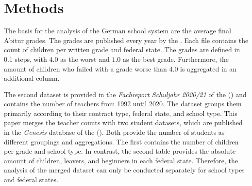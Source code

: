 \section*{Methods}

The basis for the analysis of the German school system are the average final Abitur grades. The grades are published every year by the \citeauthor{kultusminister_konferenz_abiturnoten_nodate}. Each file contains the count of children per written grade and federal state. The grades are defined in $0.1$ steps, with $4.0$ as the worst and $1.0$ as the best grade. Furthermore, the amount of children who failed with a grade worse than $4.0$ is aggregated in an additional column.

The second dataset is provided in the \textit{Fachreport Schuljahr 2020/21} of the \citeauthor{statistische_bundesamt_allgemeinbildende_2022} (\citeyear{statistische_bundesamt_allgemeinbildende_2022}) and contains the number of teachers from 1992 until 2020. The dataset groups them primarily according to their contract type, federal state, and school type. This paper merges the teacher counts with two student datasets, which are published in the \textit{Genesis} database of the \citeauthor{statistische_bundesamt_statistisches_2023} (\citeyear{statistische_bundesamt_statistisches_2023}). Both provide the number of students as different groupings and aggregations. The first contains the number of children per grade and school type. In contrast, the second table provides the absolute amount of children, leavers, and beginners in each federal state. Therefore, the analysis of the merged dataset can only be conducted separately for school types and federal states.